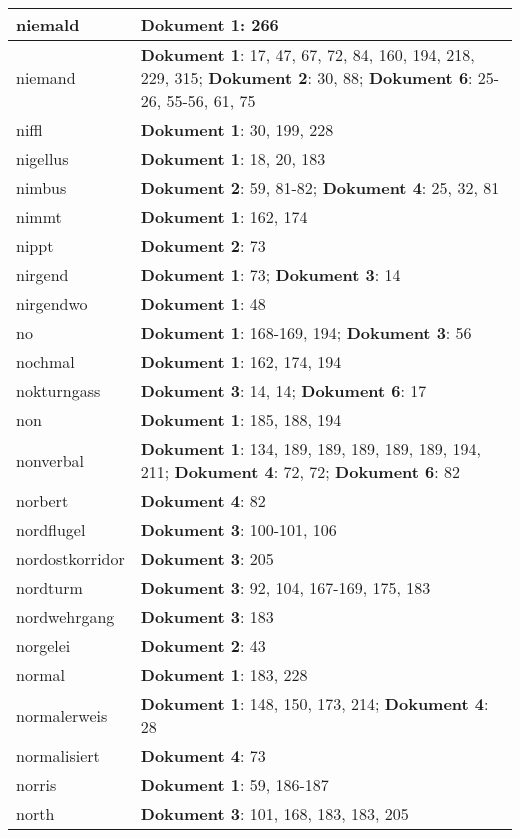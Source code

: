 \documentclass[a5paper]{article}
\begin{document}
\begin{longtable}[l]{|l|p{3in}|}
\hline
niemald & \textbf{Dokument 1}: 266 \\
\hline
niemand & \textbf{Dokument 1}: 17, 47, 67, 72, 84, 160, 194, 218, 229, 315; \textbf{Dokument 2}: 30, 88; \textbf{Dokument 6}: 25-26, 55-56, 61, 75 \\
\hline
niffl & \textbf{Dokument 1}: 30, 199, 228 \\
\hline
nigellus & \textbf{Dokument 1}: 18, 20, 183 \\
\hline
nimbus & \textbf{Dokument 2}: 59, 81-82; \textbf{Dokument 4}: 25, 32, 81 \\
\hline
nimmt & \textbf{Dokument 1}: 162, 174 \\
\hline
nippt & \textbf{Dokument 2}: 73 \\
\hline
nirgend & \textbf{Dokument 1}: 73; \textbf{Dokument 3}: 14 \\
\hline
nirgendwo & \textbf{Dokument 1}: 48 \\
\hline
no & \textbf{Dokument 1}: 168-169, 194; \textbf{Dokument 3}: 56 \\
\hline
nochmal & \textbf{Dokument 1}: 162, 174, 194 \\
\hline
nokturngass & \textbf{Dokument 3}: 14, 14; \textbf{Dokument 6}: 17 \\
\hline
non & \textbf{Dokument 1}: 185, 188, 194 \\
\hline
nonverbal & \textbf{Dokument 1}: 134, 189, 189, 189, 189, 189, 194, 211; \textbf{Dokument 4}: 72, 72; \textbf{Dokument 6}: 82 \\
\hline
norbert & \textbf{Dokument 4}: 82 \\
\hline
nordflugel & \textbf{Dokument 3}: 100-101, 106 \\
\hline
nordostkorridor & \textbf{Dokument 3}: 205 \\
\hline
nordturm & \textbf{Dokument 3}: 92, 104, 167-169, 175, 183 \\
\hline
nordwehrgang & \textbf{Dokument 3}: 183 \\
\hline
norgelei & \textbf{Dokument 2}: 43 \\
\hline
normal & \textbf{Dokument 1}: 183, 228 \\
\hline
normalerweis & \textbf{Dokument 1}: 148, 150, 173, 214; \textbf{Dokument 4}: 28 \\
\hline
normalisiert & \textbf{Dokument 4}: 73 \\
\hline
norris & \textbf{Dokument 1}: 59, 186-187 \\
\hline
north & \textbf{Dokument 3}: 101, 168, 183, 183, 205 \\

\end{longtable}
\end{document}
